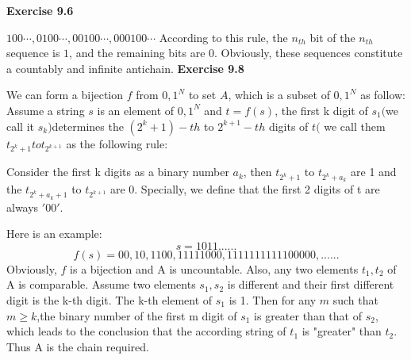 \documentclass{article} %
\begin{document}
	\textbf{Exercise 9.6}\par
	$100\cdots,0100\cdots,00100\cdots,000100\cdots$ According to this rule, the $n_{th}$ bit of the $n_{th}$ sequence is $1$, and the remaining bits are $0$. Obviously, these sequences constitute a countably and infinite antichain.
	\textbf{Exercise 9.8}\par
	 We can form a bijection $f$ from ${0,1}^N$ to set $A$, which is a subset of ${0,1}^N$ as follow: Assume a string $s$ is an element of ${0,1}^N$ and  $t=f(s)$, the first k digit of $s_1 ($we call it $s_k)$determines the $(2^{k}+1)-th$ to $2^{k+1}-th $ digits of $t ($ we  call them $t_{2^k+1} to t_{2^{k+1}}$ as the following rule:\par
	 
	 	 Consider the first k digits as a binary number $a_k$, then $t_{2^k+1}$ to $t_{2^k+a_k}$ are 1 and the $t_{2^k+a_k+1}$ to $t_{2^{k+1}}$ are 0. Specially, we define that the first 2 digits of t are always $'00'$.  
	 
	 Here is an example:
	 $$
	 s=1011......
	 $$
	 $$
	 f(s)=00,10,1100,11111000,1111111111100000,......
	 $$
	 Obviously, $f$ is a bijection and A is uncountable. Also, any two elements $t_1,t_2$ of A is comparable. Assume two elements $s_1,s_2$ is different and their first different digit is the k-th digit. The k-th element of $s_1$ is 1. Then for any $m$ such that $m \ge k$,the binary number of the first m digit of $s_1$ is greater than that of $s_2$, which leads to the conclusion that the according string of $t_1$ is "greater" than $t_2$. Thus A is the chain required. 

	
\end{document}
